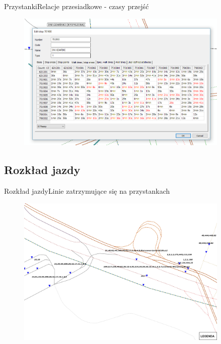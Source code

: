 \documentclass[8pt]{beamer}
\begin{document}
\begin{frame}{Przystanki}{Relacje przesiadkowe - czasy przejść}
\begin{figure}\begin{center}
\includegraphics[width=0.9\textwidth]{transfer_times}
 \end{center}  \end{figure} 
\end{frame}

\subsection{Rozkład jazdy}
\begin{frame}{Rozkład jazdy}{Linie zatrzymujące się na przystankach}
\begin{figure}\begin{center}
\includegraphics[width=0.9\textwidth]{lines}
 \end{center}  \end{figure} 
\end{frame}
\end{document}
